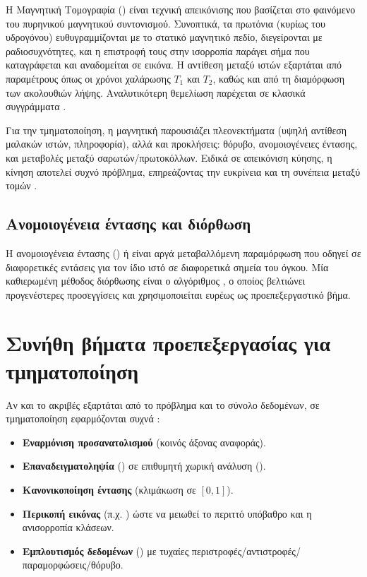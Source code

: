 Η Μαγνητική Τομογραφία () είναι τεχνική απεικόνισης που βασίζεται στο φαινόμενο του
πυρηνικού μαγνητικού συντονισμού. Συνοπτικά, τα πρωτόνια (κυρίως του υδρογόνου) ευθυγραμμίζονται με το
στατικό μαγνητικό πεδίο, διεγεί\-ρονται με ραδιοσυχνότητες, και η επιστροφή τους στην ισορροπία παράγει σήμα που
καταγράφεται και αναδομείται σε εικόνα. Η αντίθεση μεταξύ ιστών εξαρτάται από παραμέτρους όπως οι χρόνοι χαλάρωσης
$T_1$ και $T_2$, καθώς και από τη διαμόρφωση των ακολουθιών λήψης. Αναλυτικότερη θεμελίωση παρέχεται σε κλασικά
συγγράμματα \cite{haacke1999mri,mcrobbie2006mri}.

Για την τμηματοποίηση, η μαγνητική παρουσιάζει πλεονεκτήματα (υψηλή αντίθεση μαλακών ιστών,  πληροφορία), αλλά και
προκλήσεις: θόρυβο, ανομοιογένειες έντασης, και μεταβολές μεταξύ σαρωτών/πρωτοκόλλων. Ειδικά σε απεικόνιση κύησης, η
κίνηση αποτελεί συχνό πρόβλημα, επηρεάζοντας την ευκρίνεια και τη συνέπεια μεταξύ τομών
\cite{alan._2016}.

\subsection{Ανομοιογένεια έντασης και διόρθωση }

Η ανομοιογένεια έντασης () ή  είναι αργά μεταβαλλόμενη παραμόρφωση που
οδηγεί σε διαφορετικές εντάσεις για τον ίδιο ιστό σε διαφορετικά σημεία του όγκου. Μία καθιερωμένη μέθοδος διόρθωσης
είναι ο αλγόριθμος  \cite{tustison2010n4itk}, ο οποίος βελτιώνει προγενέστερες προσεγγίσεις και χρησιμοποιείται
ευρέως ως προεπεξεργαστικό βήμα.

\section{Συνήθη βήματα προεπεξεργασίας για τμηματοποίηση }
\label{subsec:preproc}

Αν και το ακριβές  εξαρτάται από το πρόβλημα και το σύνολο δεδομένων, σε  τμηματοποίηση
εφαρμόζονται συχνά \cite{app14125144}:
\begin{itemize}
  \item \textbf{Εναρμόνιση προσανατολισμού} (κοινός άξονας αναφοράς).
  \item \textbf{Επαναδειγματοληψία} () σε επιθυμητή χωρική ανάλυση ().
  \item \textbf{Κανονικοποίηση έντασης} (κλιμάκωση σε $[0,1]$).
  \item \textbf{Περικοπή εικόνας} (π.χ. ) ώστε να μειωθεί το περιττό υπόβαθρο και η ανισορροπία κλάσεων.
  \item \textbf{Εμπλουτισμός δεδομένων} () με τυχαίες περιστροφές/αντιστροφές/παραμορφώσεις/θόρυβο.
\end{itemize}

